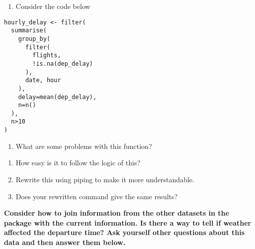 \documentclass[]{article}
\providecommand{\tightlist}{%
  \setlength{\itemsep}{0pt}\setlength{\parskip}{0pt}}
\begin{document}
\begin{enumerate}
\def\labelenumi{\arabic{enumi}.}
\setcounter{enumi}{13}
\tightlist
\item
  Consider the code below
\end{enumerate}

\begin{verbatim}
hourly_delay <- filter(
  summarise(
    group_by(
      filter(
        flights, 
        !is.na(dep_delay)
      ),
      date, hour
    ),
    delay=mean(dep_delay),
    n=n()
  ),
  n>10
)
\end{verbatim}

\begin{enumerate}
\def\labelenumi{\arabic{enumi}.}
\tightlist
\item
  What are some problems with this function?
\end{enumerate}

\begin{enumerate}
\def\labelenumi{\alph{enumi}.}
\setcounter{enumi}{1}
\tightlist
\item
  How easy is it to follow the logic of this?
\item
  Rewrite this using piping to make it more understandable.
\item
  Does your rewritten command give the same results?
\end{enumerate}

\textbf{Consider how to join information from the other datasets in the
package with the current information. Is there a way to tell if weather
affected the departure time? Ask yourself other questions about this
data and then answer them below.}
\end{document}
